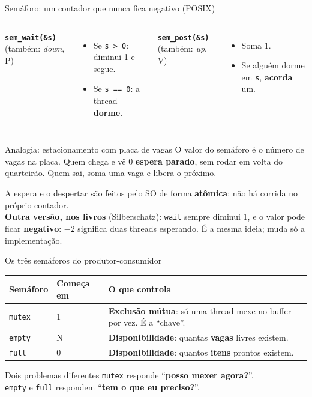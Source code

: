\documentclass[aspectratio=169]{beamer}
\begin{document}
\begin{frame}{Semáforo: um contador que nunca fica negativo (POSIX)}
\begin{columns}[T]
\textbf{\texttt{sem\_wait(\&s)}} (também: \emph{down}, P)
\begin{itemize}
    \item Se \texttt{s > 0}: diminui 1 e segue.
    \item Se \texttt{s == 0}: a thread \textbf{dorme}.
\end{itemize}

\textbf{\texttt{sem\_post(\&s)}} (também: \emph{up}, V)
\begin{itemize}
    \item Soma 1.
    \item Se alguém dorme em \texttt{s}, \textbf{acorda} um.
\end{itemize}
\end{columns}

\vspace{0.4em}
\begin{exampleblock}{Analogia: estacionamento com placa de vagas}
O valor do semáforo é o número de vagas na placa. Quem chega e vê 0 \textbf{espera parado}, sem rodar em volta do quarteirão. Quem sai, soma uma vaga e libera o próximo.
\end{exampleblock}

\footnotesize A espera e o despertar são feitos pelo SO de forma \textbf{atômica}: não há corrida no próprio contador.\\[0.3em]
\textbf{Outra versão, nos livros} (Silberschatz): \texttt{wait} sempre diminui 1, e o valor pode ficar \textbf{negativo}: $-2$ significa duas threads esperando. É a mesma ideia; muda só a implementação.
\end{frame}

\begin{frame}{Os três semáforos do produtor-consumidor}
\begin{center}
\begin{tabular}{@{}llR{7.4cm}@{}}
\toprule
\textbf{Semáforo} & \textbf{Começa em} & \textbf{O que controla} \\
\midrule
\texttt{mutex} & 1 & \textbf{Exclusão mútua}: só uma thread mexe no buffer por vez. É a ``chave''. \\
\texttt{empty} & N & \textbf{Disponibilidade}: quantas \textbf{vagas} livres existem. \\
\texttt{full} & 0 & \textbf{Disponibilidade}: quantos \textbf{itens} prontos existem. \\
\bottomrule
\end{tabular}
\end{center}

\vspace{0.6em}
\begin{alertblock}{Dois problemas diferentes}
\texttt{mutex} responde ``\textbf{posso mexer agora?}''.\\
\texttt{empty} e \texttt{full} respondem ``\textbf{tem o que eu preciso?}''.
\end{alertblock}
\end{frame}
\end{document}
